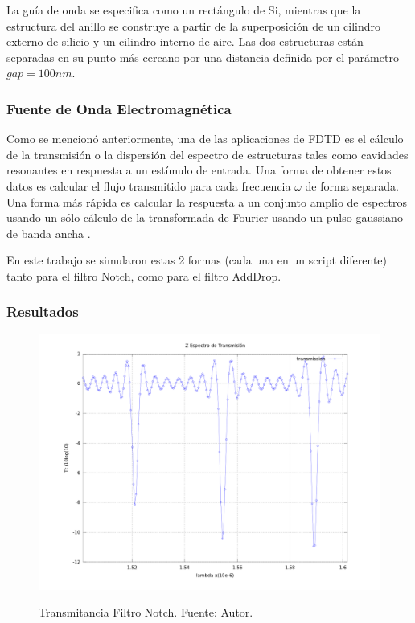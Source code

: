La guía de onda se especifica como un rectángulo de Si, mientras que la estructura del anillo se construye a partir de la superposición de un cilindro externo de silicio y un cilindro interno de aire. 
Las dos estructuras están separadas en su punto más cercano por una distancia 
definida por el parámetro $gap = 100nm$.


\subsubsection{Fuente de Onda Electromagnética} 
Como se mencionó anteriormente, una de las aplicaciones de FDTD es el cálculo 
de la transmisión o la dispersión del espectro de estructuras tales como cavidades 
resonantes en respuesta a un estímulo de entrada. Una forma de obtener estos 
datos es calcular el flujo transmitido para cada frecuencia $\omega$ de forma 
separada. Una forma más rápida es calcular la respuesta a un conjunto 
amplio de espectros usando un sólo cálculo de la transformada de Fourier usando un 
pulso gaussiano de banda ancha \cite{MIT_intro}. 

En este trabajo se simularon estas 2 formas (cada una en un script diferente)
tanto para el filtro Notch, como para el filtro AddDrop.

\subsubsection{Resultados}

\begin{figure}[H]
\caption{Transmitancia Filtro Notch. Fuente: Autor.}
\centering
\includegraphics[width=1.0\textwidth,natwidth=1200,natheight=900]{figs/gausrc_flux_mod-graph_res80.png}
\label{fig:meep_res_n}
\end{figure}

